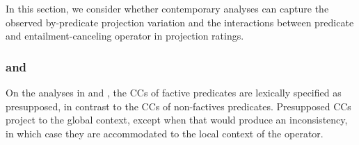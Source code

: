 \documentclass[a4paper,12pt,twoside]{article}
\begin{document}
In this section, we consider whether contemporary analyses can capture the observed by-predicate projection variation and the interactions between predicate and entailment-canceling operator in projection ratings. 

	


\subsubsection{\citealt{heim_projection_1983} and \citealt{van_der_sandt_presupposition_1992}}\label{s:heim}

On the analyses in \citealt{heim_projection_1983} and \citealt{van_der_sandt_presupposition_1992}, the CCs of factive predicates are lexically specified as presupposed, in contrast to the CCs of non-factives predicates. Presupposed CCs project to the global context, except when that would produce an inconsistency, in which case they are accommodated to the local context of the operator.
\end{document}

